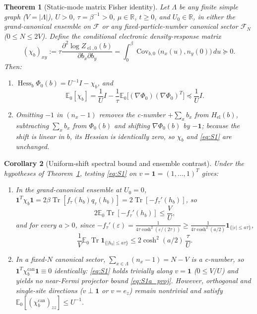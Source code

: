 \documentclass[11pt]{article}
\newtheorem{theorem}{Theorem}[section]
\newtheorem{corollary}[theorem]{Corollary}
\theoremstyle{definition}
\theoremstyle{remark}
\DeclareMathOperator{\Tr}{Tr}
\DeclareMathOperator{\Cov}{Cov}
\DeclareMathOperator{\Hess}{Hess}
\DeclareMathOperator{\el}{el}
\DeclareMathOperator{\can}{can}
\newcommand{\E}{\mathbb{E}}
\newcommand{\R}{\mathbb{R}}
\begin{document}
\begin{theorem}[Static-mode matrix Fisher identity]
\label{thm:S1}
Let $\Lambda$ be any finite simple graph ($V = |\Lambda|$), $U > 0$, $\tau = \beta^{-1} > 0$, $\mu \in \R$, $t \ge 0$, and $U_0 \in \R$, in either the grand-canonical ensemble on $\mathcal{F}$ or any fixed-particle-number canonical sector $\mathcal{F}_N$ ($0 \le N \le 2V$). Define the conditional electronic density-response matrix
\begin{equation}
(\chi_b)_{xy} := \tau \frac{\partial^2 \log Z_{\el,0}(b)}{\partial b_x \partial b_y} = \int_0^\beta \Cov_{b,0}\bigl(n_x(u), n_y(0)\bigr)\,du \succeq 0.
\label{eq:chib}
\end{equation}
Then:
\begin{enumerate}[label=(\roman*),leftmargin=2.2em]
\item $\Hess_b \Phi_0(b) = U^{-1} I - \chi_b$, and
\begin{equation}
\E_0[\chi_b] = \frac{1}{U} I - \frac{1}{\tau} \E_0\bigl[(\nabla \Phi_0)(\nabla \Phi_0)^T\bigr] \preceq \frac{1}{U} I.
\label{eq:S1}
\end{equation}
\item Omitting $-1$ in $(n_x - 1)$ removes the c-number $+\sum_x b_x$ from $H_{\el}(b)$, subtracting $\sum_x b_x$ from $\Phi_0(b)$ and shifting $\nabla \Phi_0(b)$ by $-\mathbf{1}$; because the shift is linear in $b$, its Hessian is identically zero, so $\chi_b$ and \eqref{eq:S1} are unchanged.
\end{enumerate}
\end{theorem}

\begin{corollary}[Uniform-shift spectral bound and ensemble contrast]
\label{cor:S1a}
Under the hypotheses of Theorem~\ref{thm:S1}, testing \eqref{eq:S1} on $v = \mathbf{1} = (1,\dots,1)^T$ gives:
\begin{enumerate}[label=(\roman*),leftmargin=2.2em]
\item In the grand-canonical ensemble at $U_0 = 0$, $\mathbf{1}^T \chi_b \mathbf{1} = 2\beta \Tr[f_\tau(h_b)q_\tau(h_b)] = 2\Tr[-f_\tau'(h_b)]$, so
\begin{equation}
2 \E_0 \Tr[-f_\tau'(h_b)] \le \frac{V}{U},
\label{eq:S1a_trace}
\end{equation}
and for every $a > 0$, since $-f_\tau'(\varepsilon) = \frac{1}{4\tau \cosh^2(\varepsilon/(2\tau))} \ge \frac{1}{4\tau \cosh^2(a/2)}\mathbf{1}_{\{|\varepsilon| \le a\tau\}}$,
\begin{equation}
\frac{1}{V} \E_0 \Tr\mathbf{1}_{\{|h_b| \le a\tau\}} \le 2\cosh^2(a/2)\,\frac{\tau}{U}.
\label{eq:S1a_proj}
\end{equation}
\item In a fixed-$N$ canonical sector, $\sum_{x\in\Lambda}(n_x - 1) = N - V$ is a c-number, so $\mathbf{1}^T \chi_b^{\can} \mathbf{1} \equiv 0$ identically: \eqref{eq:S1} holds trivially along $v = \mathbf{1}$ ($0 \le V/U$) and yields no near-Fermi projector bound \eqref{eq:S1a_proj}. However, orthogonal and single-site directions ($v \perp \mathbf{1}$ or $v = e_z$) remain nontrivial and satisfy $\E_0[(\chi_b^{\can})_{zz}] \le U^{-1}$.
\end{enumerate}
\end{corollary}
\end{document}

